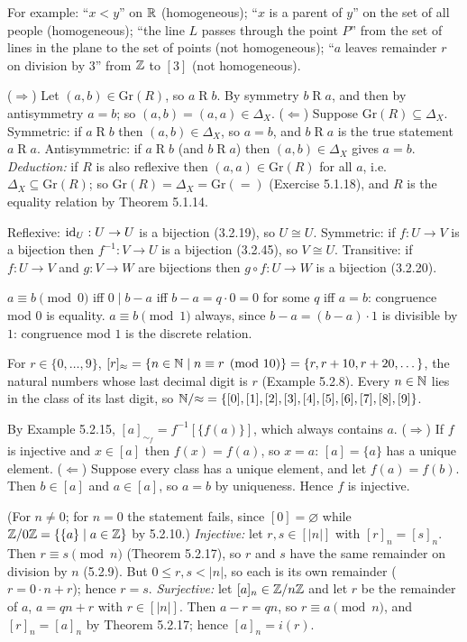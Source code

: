  For example: ``$x<y$'' on $\mathbb{R}$ (homogeneous); ``$x$ is a parent of $y$'' on the set of all people (homogeneous); ``the line $L$ passes through the point $P$'' from the set of lines in the plane to the set of points (not homogeneous); ``$a$ leaves remainder $r$ on division by $3$'' from $\mathbb{Z}$ to $[3]$ (not homogeneous).

 ($\Rightarrow$) Let $(a,b)\in\mathrm{Gr}(R)$, so $a\mathrel Rb$. By symmetry $b\mathrel Ra$, and then by antisymmetry $a=b$; so $(a,b)=(a,a)\in\Delta_X$. ($\Leftarrow$) Suppose $\mathrm{Gr}(R)\subseteq\Delta_X$. Symmetric: if $a\mathrel Rb$ then $(a,b)\in\Delta_X$, so $a=b$, and $b\mathrel Ra$ is the true statement $a\mathrel Ra$. Antisymmetric: if $a\mathrel Rb$ (and $b\mathrel Ra$) then $(a,b)\in\Delta_X$ gives $a=b$. \emph{Deduction:} if $R$ is also reflexive then $(a,a)\in\mathrm{Gr}(R)$ for all $a$, i.e.\ $\Delta_X\subseteq\mathrm{Gr}(R)$; so $\mathrm{Gr}(R)=\Delta_X=\mathrm{Gr}(=)$ (Exercise 5.1.18), and $R$ is the equality relation by Theorem 5.1.14.

 Reflexive: $\mathrm{id}_U:U\to U$ is a bijection (3.2.19), so $U\cong U$. Symmetric: if $f:U\to V$ is a bijection then $f^{-1}:V\to U$ is a bijection (3.2.45), so $V\cong U$. Transitive: if $f:U\to V$ and $g:V\to W$ are bijections then $g\circ f:U\to W$ is a bijection (3.2.20).

 $a\equiv b\pmod0$ iff $0\mid b-a$ iff $b-a=q\cdot0=0$ for some $q$ iff $a=b$: congruence mod $0$ is equality. $a\equiv b\pmod1$ always, since $b-a=(b-a)\cdot1$ is divisible by $1$: congruence mod $1$ is the discrete relation.

 For $r\in\{0,\dots,9\}$, $[r]_{\approx}=\{n\in\mathbb{N}\mid n\equiv r\pmod{10}\}=\{r,r+10,r+20,\dots\}$, the natural numbers whose last decimal digit is $r$ (Example 5.2.8). Every $n\in\mathbb{N}$ lies in the class of its last digit, so $\mathbb{N}/{\approx}=\{[0],[1],[2],[3],[4],[5],[6],[7],[8],[9]\}$.

 By Example 5.2.15, $[a]_{\sim_f}=f^{-1}[\{f(a)\}]$, which always contains $a$. ($\Rightarrow$) If $f$ is injective and $x\in[a]$ then $f(x)=f(a)$, so $x=a$: $[a]=\{a\}$ has a unique element. ($\Leftarrow$) Suppose every class has a unique element, and let $f(a)=f(b)$. Then $b\in[a]$ and $a\in[a]$, so $a=b$ by uniqueness. Hence $f$ is injective.

 (For $n\ne0$; for $n=0$ the statement fails, since $[0]=\varnothing$ while $\mathbb{Z}/0\mathbb{Z}=\{\{a\}\mid a\in\mathbb{Z}\}$ by 5.2.10.) \emph{Injective:} let $r,s\in[|n|]$ with $[r]_n=[s]_n$. Then $r\equiv s\pmod n$ (Theorem 5.2.17), so $r$ and $s$ have the same remainder on division by $n$ (5.2.9). But $0\le r,s<|n|$, so each is its own remainder ($r=0\cdot n+r$); hence $r=s$. \emph{Surjective:} let $[a]_n\in\mathbb{Z}/n\mathbb{Z}$ and let $r$ be the remainder of $a$, $a=qn+r$ with $r\in[|n|]$. Then $a-r=qn$, so $r\equiv a\pmod n$, and $[r]_n=[a]_n$ by Theorem 5.2.17; hence $[a]_n=i(r)$.

